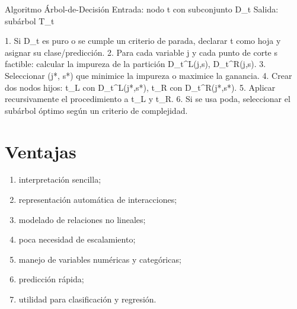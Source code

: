 \documentclass[
  spanish,
  10.5pt,
  letterpaper,
  DIV=11,
  numbers=noendperiod,
  oneside,
  open=any]{scrreprt}
\newenvironment{Shaded}{\begin{snugshade}}{\end{snugshade}}
\newcommand{\NormalTok}[1]{\textcolor[rgb]{0.00,0.23,0.31}{#1}}
\providecommand{\tightlist}{%
  \setlength{\itemsep}{0pt}\setlength{\parskip}{0pt}}
\theoremstyle{definition}
\theoremstyle{definition}
\theoremstyle{plain}
\theoremstyle{remark}
\begin{document}
\begin{tcolorbox}[enhanced jigsaw, arc=.35mm, bottomrule=.15mm, bottomtitle=1mm, breakable, colback=white, colbacktitle=quarto-callout-note-color!10!white, colframe=quarto-callout-note-color-frame, coltitle=black, left=2mm, leftrule=.75mm, opacityback=0, opacitybacktitle=0.6, rightrule=.15mm, title=\textcolor{quarto-callout-note-color}{\faInfo}\hspace{0.5em}{Seudocódigo matemático formal}, titlerule=0mm, toprule=.15mm, toptitle=1mm]

\begin{Shaded}
\begin{Highlighting}[numbers=left,,]
\NormalTok{Algoritmo Árbol{-}de{-}Decisión}
\NormalTok{Entrada:}
\NormalTok{  nodo t con subconjunto D\_t}
\NormalTok{Salida:}
\NormalTok{  subárbol T\_t}

\NormalTok{1. Si D\_t es puro o se cumple un criterio de parada,}
\NormalTok{      declarar t como hoja y asignar su clase/predicción.}
\NormalTok{2. Para cada variable j y cada punto de corte s factible:}
\NormalTok{      calcular la impureza de la partición}
\NormalTok{         D\_t\^{}L(j,s), D\_t\^{}R(j,s).}
\NormalTok{3. Seleccionar (j*, s*) que minimice la impureza o maximice la ganancia.}
\NormalTok{4. Crear dos nodos hijos:}
\NormalTok{      t\_L con D\_t\^{}L(j*,s*),}
\NormalTok{      t\_R con D\_t\^{}R(j*,s*).}
\NormalTok{5. Aplicar recursivamente el procedimiento a t\_L y t\_R.}
\NormalTok{6. Si se usa poda, seleccionar el subárbol óptimo según un criterio de complejidad.}
\end{Highlighting}
\end{Shaded}

\end{tcolorbox}

\section*{Ventajas}\label{ventajas-1}


\begin{enumerate}
\def\labelenumi{\arabic{enumi}.}
\tightlist
\item
  interpretación sencilla;
\item
  representación automática de interacciones;
\item
  modelado de relaciones no lineales;
\item
  poca necesidad de escalamiento;
\item
  manejo de variables numéricas y categóricas;
\item
  predicción rápida;
\item
  utilidad para clasificación y regresión.
\end{enumerate}
\end{document}

